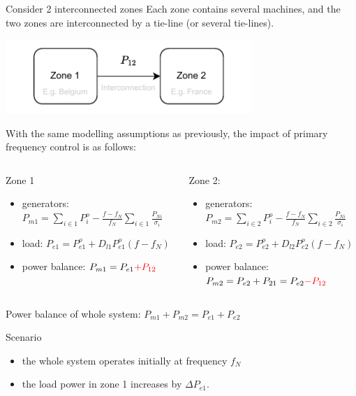 \begin{frame}[allowframebreaks]{Consider 2 interconnected zones}
  Each zone contains several machines, and the two zones are interconnected by a tie-line (or several tie-lines).  
  \begin{center}
        \includegraphics[width=0.7\textwidth]{images/zones.pdf} \\
    \end{center}
    
    
    With the same modelling assumptions as previously, the impact of primary frequency control is as follows:
    \begin{columns}
      \begin{column}{0.48\textwidth}
        Zone 1
        \begin{itemize}
          \item generators: $P_{m1} = \sum_{i \in 1} P_i^o - \frac{f - f_N}{f_N} \sum_{i \in 1} \frac{P_{Ni}}{\sigma_i}$ 
          \item load: $P_{e1} = P_{e1}^o + D_{l1} P_{e1}^o (f - f_N)$ 
          \item power balance: $P_{m1} = P_{e1} \color{red}{+ P_{12}}$ 
        \end{itemize}
      \end{column}
      \begin{column}{0.48\textwidth}
      Zone 2:
      \begin{itemize}
        \item generators: $P_{m2} = \sum_{i \in 2} P_i^o - \frac{f - f_N}{f_N} \sum_{i \in 2} \frac{P_{Ni}}{\sigma_i}$ 
        \item load: $P_{e2} = P_{e2}^o + D_{l2} P_{e2}^o (f - f_N)$ 
        \item power balance: $P_{m2} = P_{e2} + P_{21} = P_{e2} \color{red}{- P_{12}}$ 
      \end{itemize}
      \end{column}
    \end{columns}
    Power balance of whole system: $P_{m1} + P_{m2} = P_{e1} + P_{e2}$ 

    \begin{block}{Scenario}
    
      \begin{itemize}
        \item the whole system operates initially at frequency $f_N$ 
        \item the load power in zone 1 increases by $\Delta P_{e1}$.
      \end{itemize}
    \end{block}
  \end{frame}


